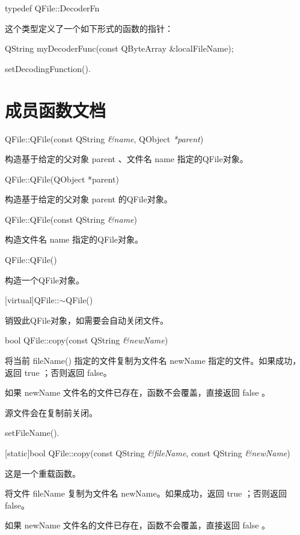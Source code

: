 typedef QFile::DecoderFn

这个类型定义了一个如下形式的函数的指针：


\begin{cppcode}
QString myDecoderFunc(const QByteArray &localFileName);
\end{cppcode}


\begin{seeAlso}
setDecodingFunction().
\end{seeAlso} 

\splitLine

\section{成员函数文档}

QFile::QFile(const QString \emph{\&name}, QObject \emph{*parent})

构造基于给定的父对象 parent 、文件名 name 指定的QFile对象。

QFile::QFile(QObject *parent)

构造基于给定的父对象 parent 的QFile对象。

QFile::QFile(const QString \emph{\&name})

构造文件名 name 指定的QFile对象。

QFile::QFile()

构造一个QFile对象。

[virtual]QFile::$\sim$QFile()

销毁此QFile对象，如需要会自动关闭文件。

bool QFile::copy(const QString \emph{\&newName})

将当前 fileName() 指定的文件复制为文件名 newName 指定的文件。如果成功，返回 true ；否则返回 false。


\begin{notice}
如果 newName 文件名的文件已存在，函数不会覆盖，直接返回 false 。
\end{notice} 

源文件会在复制前关闭。

\begin{seeAlso}
setFileName().
\end{seeAlso} 

[static]bool QFile::copy(const QString \emph{\&fileName}, const QString \emph{\&newName})

这是一个重载函数。

将文件 fileName 复制为文件名 newName。如果成功，返回 true ；否则返回 false。


\begin{notice}
如果 newName 文件名的文件已存在，函数不会覆盖，直接返回 false 。
\end{notice} 

